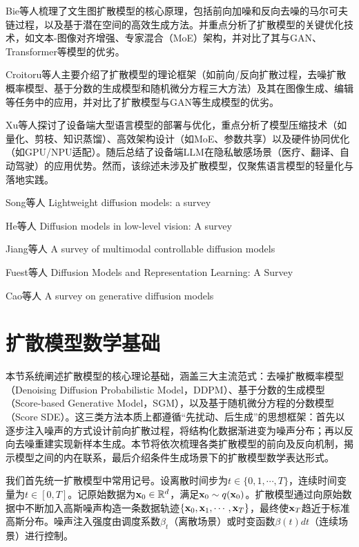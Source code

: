 \documentclass[11pt,a4paper,UTF8]{ctexart}
\begin{document}
Bie等人\cite{bie2024renaissance}梳理了文生图扩散模型的核心原理，包括前向加噪和反向去噪的马尔可夫链过程，以及基于潜在空间的高效生成方法。并重点分析了扩散模型的关键优化技术，如文本-图像对齐增强、专家混合（MoE）架构，并对比了其与GAN、Transformer等模型的优劣。

Croitoru等人\cite{croitoru2023diffusion}主要介绍了扩散模型的理论框架（如前向/反向扩散过程，去噪扩散概率模型、基于分数的生成模型和随机微分方程三大方法）及其在图像生成、编辑等任务中的应用，并对比了扩散模型与GAN等生成模型的优劣。

Xu等人\cite{xu2024device}探讨了设备端大型语言模型的部署与优化，重点分析了模型压缩技术（如量化、剪枝、知识蒸馏）、高效架构设计（如MoE、参数共享）以及硬件协同优化（如GPU/NPU适配）。随后总结了设备端LLM在隐私敏感场景（医疗、翻译、自动驾驶）的应用优势。然而，该综述未涉及扩散模型，仅聚焦语言模型的轻量化与落地实践。

Song等人\cite{song2024lightweight} Lightweight diffusion models: a survey

He等人\cite{he2025diffusion} Diffusion models in low-level vision: A survey

Jiang等人\cite{jiang2024survey} A survey of multimodal controllable diffusion models

Fuest等人\cite{fuest2024diffusion} Diffusion Models and Representation Learning: A Survey

Cao等人\cite{cao2024survey} A survey on generative diffusion models


\newpage

\section{扩散模型数学基础}

本节系统阐述扩散模型的核心理论基础，涵盖三大主流范式：去噪扩散概率模型（Denoising Diffusion Probabilistic Model，DDPM）\cite{sohldickstein2015diffusion,ho2020denoising}、基于分数的生成模型（Score-based Generative Model，SGM）\cite{song2019generative,song2020improved}，以及基于随机微分方程的分数模型（Score SDE）\cite{song2020score,karras2022elucidating}。这三类方法本质上都遵循“先扰动、后生成”的思想框架：首先以逐步注入噪声的方式设计前向扩散过程，将结构化数据渐进变为噪声分布；再以反向去噪重建实现新样本生成。本节将依次梳理各类扩散模型的前向及反向机制，揭示模型之间的内在联系，最后介绍条件生成场景下的扩散模型数学表达形式。

我们首先统一扩散模型中常用记号。设离散时间步为$t\in\{0,1,\cdots,T\}$，连续时间变量为$t\in[0,T]$。记原始数据为$\mathbf{x}_0\in\mathbb{R}^d$，满足$\mathbf{x}_0\sim q(\mathbf{x}_0)$。扩散模型通过向原始数据中不断加入高斯噪声构造一条数据轨迹$\{\mathbf{x}_0,\mathbf{x}_1,\cdots,\mathbf{x}_T\}$，最终使$\mathbf{x}_T$趋近于标准高斯分布。噪声注入强度由调度系数$\beta_t$（离散场景）或时变函数$\beta(t)dt$（连续场景）进行控制。
\end{document}
